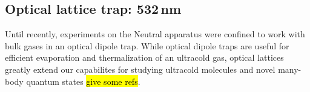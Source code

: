 %
%
%
%
%
%


\pagebreak
\subsection{Optical lattice trap: 532\,nm} \label{ssec:532sys}
Until recently, experiments on the Neutral apparatus were confined to work with bulk gases in an optical dipole trap.
While optical dipole traps are useful for efficient evaporation and thermalization of an ultracold gas, optical lattices greatly extend our capabilites for studying ultracold molecules and novel many-body quantum states \hl{give some refs}.

